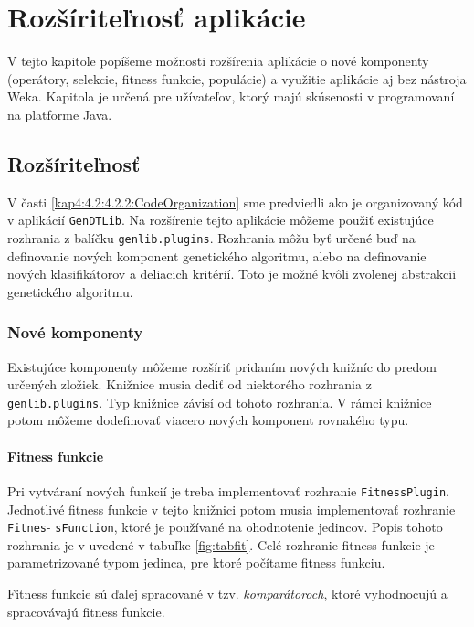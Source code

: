 \chapter{Rozšíriteľnosť aplikácie}\label{kapIII}
V tejto kapitole popíšeme možnosti rozšírenia aplikácie o nové komponenty (operátory, selekcie, fitness funkcie, populácie) a využitie aplikácie aj bez nástroja Weka. Kapitola je určená pre užívateľov, ktorý majú skúsenosti v programovaní na platforme Java.

\section{Rozšíriteľnosť}\label{kap4:4.4:Plugin}
V časti \ref{kap4:4.2:4.2.2:CodeOrganization} sme predviedli ako je organizovaný kód v aplikácií \verb|GenDTLib|.
Na rozšírenie tejto aplikácie môžeme použiť existujúce rozhrania z balíčku \verb|genlib.plugins|. Rozhrania môžu byť určené buď na definovanie nových komponent genetického algoritmu, alebo na definovanie nových klasifikátorov a deliacich kritérií. Toto je možné kvôli zvolenej abstrakcii genetického algoritmu.
\subsection{Nové komponenty}
Existujúce komponenty môžeme rozšíriť pridaním nových knižníc do predom určených zložiek. Knižnice musia dediť od niektorého rozhrania z \verb|genlib.plugins|. Typ knižnice závisí od tohoto rozhrania. V rámci knižnice potom môžeme  dodefinovať viacero nových komponent rovnakého typu. 

\subsubsection*{Fitness funkcie}
Pri vytváraní nových funkcií je treba implementovať rozhranie \verb|FitnessPlugin|. Jednotlivé fitness funkcie v tejto knižnici potom musia implementovať rozhranie \verb|Fitnes|- \verb|sFunction|, ktoré je používané na ohodnotenie jedincov.
Popis tohoto rozhrania je v uvedené v tabuľke \ref{fig:tabfit}. Celé rozhranie fitness funkcie je parametrizované typom jedinca, pre ktoré počítame fitness funkciu.

Fitness funkcie sú ďalej spracované v tzv. \emph{komparátoroch}, ktoré vyhodnocujú a spracovávajú fitness funkcie.

